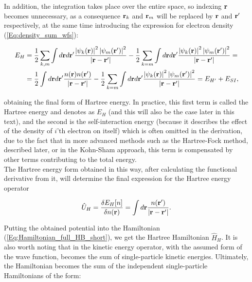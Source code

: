 In addition, the integration takes place over the entire space, so indexing $\mathbf{r} $ becomes unnecessary, as a consequence $\mathbf{r}_k$ and $\mathbf{r}_m$ will be replaced by $\mathbf{r}$ and $\mathbf{r}'$ respectively, at the same time introducing the expression for electron density (\ref{Eq:density_sum_wfs}):

\begin{equation}
    \begin{aligned}
        \label{Eq:energy_hartree3}
        E_H&=\frac{1}{2}\sum_{k,m}\int d\mathbf{r}d\mathbf{r}'\frac{\left|\psi_k(\mathbf{r})\right|^2\left|\psi_m(\mathbf{r}')\right|^2}{\left|\mathbf{r}-\mathbf{r}'\right|}-\frac{1}{2}\sum_{\substack{k=m}}\int d\mathbf{r}d\mathbf{r}'\frac{\left|\psi_k(\mathbf{r})\right|^2\left|\psi_m(\mathbf{r}')\right|^2}{\left|\mathbf{r}-\mathbf{r}'\right|}=\\
        &=\frac{1}{2}\int d\mathbf{r}d\mathbf{r}'\frac{n(\mathbf{r})n(\mathbf{r}')}{\left|\mathbf{r}-\mathbf{r}'\right|}-\frac{1}{2}\sum_{k=m}\int d\mathbf{r}d\mathbf{r}'\frac{\left|\psi_k(\mathbf{r})\right|^2\left|\psi_m(\mathbf{r}')\right|^2}{\left|\mathbf{r}-\mathbf{r}'\right|}=E_{H'}+E_{SI},
    \end{aligned}
\end{equation}

obtaining the final form of Hartree energy.
In practice, this first term is called the Hartree energy and denotes as $E_H$ (and this will also be the case later in this text), and the second is the self-interaction energy (because it describes the effect of the density of $i$'th electron on itself) which is often omitted in the derivation, due to the fact that in more advanced methods such as the Hartree-Fock method, described later, or in the Kohn-Sham approach, this term is compensated by other terms contributing to the total energy.\\
The Hartree energy form obtained in this way, after calculating the functional derivative from it, will determine the final expression for the Hartree energy operator

\begin{equation}
    \label{Eq:hartree_potential}
    \hat{U}_H=\frac{\delta E_H[n]}{\delta n(\mathbf{r})}=\int d\mathbf{r}\frac{n(\mathbf{r}')}{\left|\mathbf{r}-\mathbf{r}'\right|}.
\end{equation}

Putting the obtained potential into the Hamiltonian (\ref{Eq:Hamiltonian_full_HB_short}), we get the Hartree Hamiltonian $\hat{H}_H$.
It is also worth noting that in the kinetic energy operator, with the assumed form of the wave function, becomes the sum of single-particle kinetic energies.
Ultimately, the Hamiltonian becomes the sum of the independent single-particle Hamiltonians of the form:

